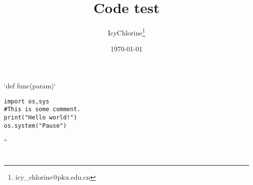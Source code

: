\documentclass[UTF8]{ctexart}
\title{Code test}
\author{IcyChlorine\footnote{icy\_chlorine@pku.edu.cn}}
\date{\today}
\begin{document}
	\maketitle


`def func(param)`

\begin{lstlisting}
import os,sys
#This is some comment.
print("Hello world!")
os.system("Pause")
\end{lstlisting}

``

\section{}
\end{document}
